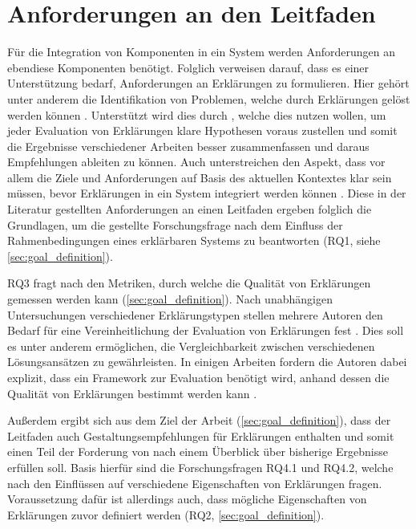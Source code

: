 \section{Anforderungen an den Leitfaden}

Für die Integration von Komponenten in ein System werden Anforderungen an ebendiese Komponenten benötigt. Folglich verweisen \citeauthor{chazette_end-users_nodate, doshi2017towards} darauf, dass es einer Unterstützung bedarf, Anforderungen an Erklärungen zu formulieren. Hier gehört unter anderem die Identifikation von Problemen, welche durch Erklärungen gelöst werden können \cite{chazette_end-users_nodate, doshi2017towards}. Unterstützt wird dies durch \citeauthor{waa_evaluating_2021}, welche dies nutzen wollen, um jeder Evaluation von Erklärungen klare Hypothesen voraus zustellen und somit die Ergebnisse verschiedener Arbeiten besser zusammenfassen und daraus Empfehlungen ableiten zu können. Auch \citeauthor{kohl_explainability_2019} unterstreichen den Aspekt, dass vor allem die Ziele und Anforderungen auf Basis des aktuellen Kontextes klar sein müssen, bevor Erklärungen in ein System integriert werden können \cite{kohl_explainability_2019}. Diese in der Literatur gestellten Anforderungen an einen Leitfaden ergeben folglich die Grundlagen, um die gestellte Forschungsfrage nach dem Einfluss der Rahmenbedingungen eines erklärbaren Systems zu beantworten (RQ1, siehe \autoref{sec:goal_definition}).

RQ3 fragt nach den Metriken, durch welche die Qualität von Erklärungen gemessen werden kann (\autoref{sec:goal_definition}). Nach unabhängigen Untersuchungen verschiedener Erklärungstypen stellen mehrere Autoren den Bedarf für eine Vereinheitlichung der Evaluation von Erklärungen fest \cite{cirqueira_scenario-based_2020,zahedi_towards_2019, nunes_systematic_2017, martin_evaluating_2021}. Dies soll es unter anderem ermöglichen, die Vergleichbarkeit zwischen verschiedenen Lösungsansätzen zu gewährleisten. In einigen Arbeiten fordern die Autoren dabei explizit, dass ein Framework zur Evaluation benötigt wird, anhand dessen die Qualität von Erklärungen bestimmt werden kann \cite{nunes_systematic_2017,sokol_explainability_2020,chari_explanation_2020}.

Außerdem ergibt sich aus dem Ziel der Arbeit (\autoref{sec:goal_definition}), dass der Leitfaden auch Gestaltungsempfehlungen für Erklärungen enthalten und somit einen Teil der Forderung von \citeauthor{waa_evaluating_2021} nach einem Überblick über bisherige Ergebnisse erfüllen soll. Basis hierfür sind die Forschungsfragen RQ4.1 und RQ4.2, welche nach den Einflüssen auf verschiedene Eigenschaften von Erklärungen fragen. Voraussetzung dafür ist allerdings auch, dass mögliche Eigenschaften von Erklärungen zuvor definiert werden (RQ2, \autoref{sec:goal_definition}).

